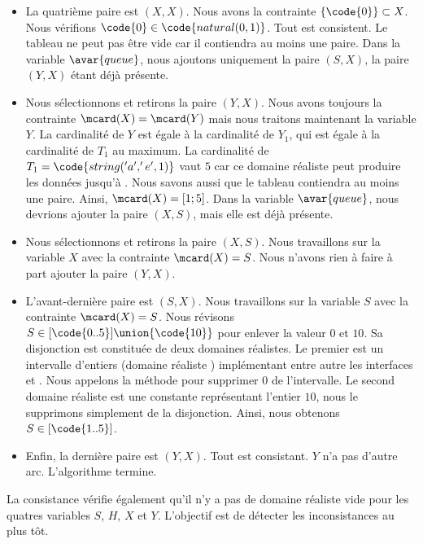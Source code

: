 \begin{example}
\begin{itemize}
\item La quatrième paire est $(X, X)$. Nous avons la contrainte $\{\code{0}\}
\subset X$. Nous vérifions $\code{0} \in \code{natural(0, 1)}$. Tout est
consistent. Le tableau ne peut pas être vide car il contiendra au moins une
paire. Dans la variable $\avar{queue}$, nous ajoutons uniquement la paire $(S,
X)$, la paire $(Y, X)$ étant déjà présente.

\item Nous sélectionnons et retirons la paire $(Y, X)$. Nous avons toujours la
contrainte $\mcard(X) = \mcard(Y)$ mais nous traitons maintenant la variable
$Y$. La cardinalité de $Y$ est égale à la cardinalité de $Y_1$, qui est égale à
la cardinalité de $T_1$ au maximum. La cardinalité de $T_1 = \code{string('a',
'e', 1)}$ vaut $5$ car ce domaine réaliste peut produire les données 
jusqu'à . Nous savons aussi que le tableau contiendra au moins une
paire. Ainsi, $\mcard(X) = [1; 5]$. Dans la variable $\avar{queue}$, nous
devrions ajouter la paire $(X, S)$, mais elle est déjà présente.

\item Nous sélectionnons et retirons la paire $(X, S)$. Nous travaillons sur la
variable $X$ avec la contrainte $\mcard(X) = S$. Nous n'avons rien à faire à
part ajouter la paire $(Y, X)$.

\item L'avant-dernière paire est $(S, X)$. Nous travaillons sur la variable $S$
avec la con\-train\-te $\mcard(X) = S$. Nous révisons $S \in [\code{0..5}]
\union \{\code{10}\}$ pour enlever la valeur $0$ et $10$. Sa disjonction est
constituée de deux domaines réalistes. Le premier est un intervalle d'entiers
(domaine réaliste ) implémentant entre autre les interfaces
 et . Nous appelons la méthode 
pour supprimer $0$ de l'intervalle. Le second domaine réaliste est une constante
représentant l'entier $10$, nous le supprimons simplement de la disjonction.
Ainsi, nous obtenons $S \in [\code{1..5}]$.

\item Enfin, la dernière paire est $(Y, X)$. Tout est consistant. $Y$ n'a pas
d'autre arc. L'algorithme termine.

\end{itemize}

\end{example}

La consistance vérifie également qu'il n'y a pas de domaine réaliste vide pour
les quatres variables $S$, $H$, $X$ et $Y$. L'objectif est de détecter les
inconsistances au plus tôt.

